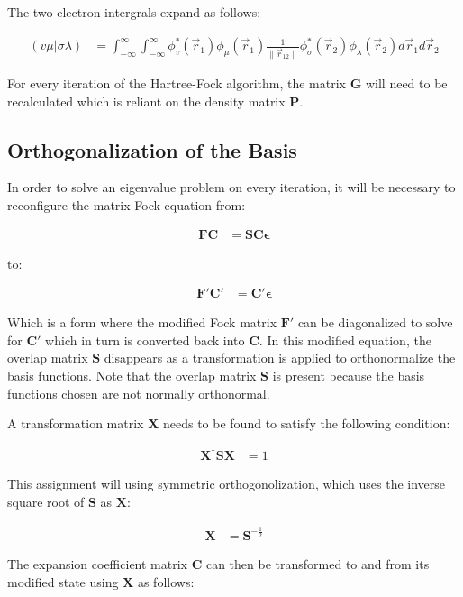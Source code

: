 \documentclass[10pt, oneside, letterpaper]{article}
\begin{document}
The two-electron intergrals expand as follows:

\begin{align*}
  (v\mu|\sigma\lambda) &= \int_{-\infty}^{\infty}\int_{-\infty}^{\infty}  \phi_v^\ast(\vec{r}_1)\phi_\mu(\vec{r}_1) \frac{1}{\|\vec{r}_{12}\|}  \phi_\sigma^\ast(\vec{r}_2)\phi_\lambda(\vec{r}_2)  d\vec{r}_1d\vec{r}_2
\end{align*}

For every iteration of the Hartree-Fock algorithm, the matrix $\bm{G}$ will need to be recalculated which is reliant on the density matrix $\bm{P}$.

\subsection{Orthogonalization of the Basis}

In order to solve an eigenvalue problem on every iteration, it will be necessary to reconfigure the matrix Fock equation from:

\begin{align*}
\bm{F}\bm{C} &= \bm{S}\bm{C}\bm{\epsilon}
\end{align*}

to:

\begin{align*}
\bm{F}'\bm{C}' &= \bm{C}'\bm{\epsilon}
\end{align*}

Which is a form where the modified Fock matrix $\bm{F}'$ can be diagonalized to solve for $\bm{C}'$ which in turn is converted back into $\bm{C}$. In this modified equation, the overlap matrix $\bm{S}$ disappears as a transformation is applied to orthonormalize the basis functions. Note that the overlap matrix $\bm{S}$ is present because the basis functions chosen are not normally orthonormal.

A transformation matrix $\bm{X}$ needs to be found to satisfy the following condition:

\begin{align*}
\bm{X}^\dagger\bm{S}\bm{X} &= 1
\end{align*}

This assignment will using symmetric orthogonolization, which uses the inverse square root of $\bm{S}$ as $\bm{X}$:

\begin{align*}
\bm{X} &= \bm{S}^{-\frac{1}{2}}
\end{align*}

The expansion coefficient matrix $\bm{C}$ can then be transformed to and from its modified state using $\bm{X}$ as follows:
\end{document}
